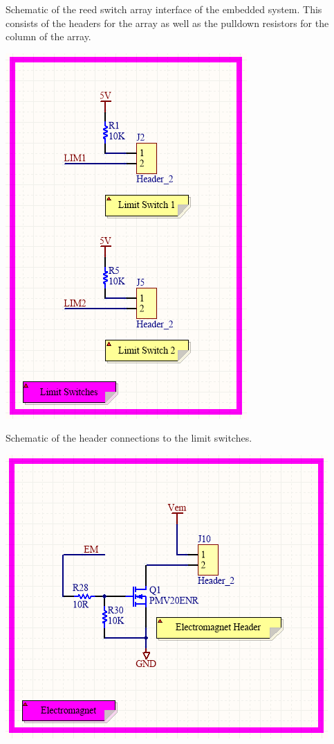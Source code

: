 \documentclass[12pt]{article}
\begin{document}
\begin{center}
Schematic of the reed switch array interface of the embedded system. This consists of the headers for the array as well as the pulldown resistors for the column of the array.
\end{center}

\vspace*{5mm}

\vspace*{5mm}

\centerline{\includegraphics[scale=.75]{SchLim}}

\begin{center}
Schematic of the header connections to the limit switches.
\end{center}

\vspace*{5mm}

\vspace*{5mm}

\centerline{\includegraphics[scale=.75]{SchElectromagnet}}
\end{document}
